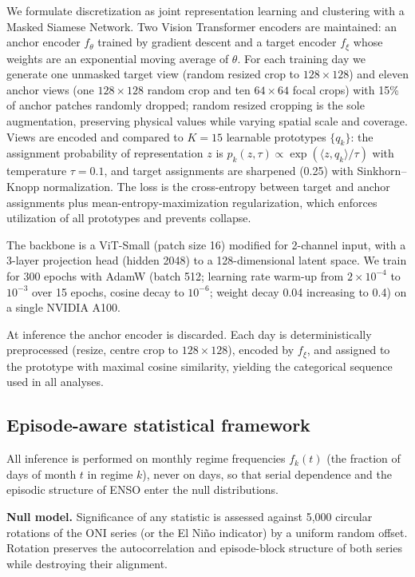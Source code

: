 \documentclass[pdflatex,sn-nature]{sn-jnl}
\begin{document}
We formulate discretization as joint representation learning and clustering with a Masked Siamese Network\cite{msn}. Two Vision Transformer\cite{vit_paper} encoders are maintained: an anchor encoder $f_\theta$ trained by gradient descent and a target encoder $f_\xi$ whose weights are an exponential moving average of $\theta$. For each training day we generate one unmasked target view (random resized crop to $128 \times 128$) and eleven anchor views (one $128 \times 128$ random crop and ten $64 \times 64$ focal crops) with 15\% of anchor patches randomly dropped; random resized cropping is the sole augmentation, preserving physical values while varying spatial scale and coverage. Views are encoded and compared to $K = 15$ learnable prototypes $\{q_k\}$\cite{caron2020swav}: the assignment probability of representation $z$ is $p_k(z,\tau) \propto \exp(\langle z, q_k\rangle/\tau)$ with temperature $\tau = 0.1$, and target assignments are sharpened (0.25) with Sinkhorn--Knopp normalization. The loss is the cross-entropy between target and anchor assignments plus mean-entropy-maximization regularization, which enforces utilization of all prototypes and prevents collapse.

The backbone is a ViT-Small (patch size 16) modified for 2-channel input, with a 3-layer projection head (hidden 2048) to a 128-dimensional latent space. We train for 300 epochs with AdamW (batch 512; learning rate warm-up from $2\times10^{-4}$ to $10^{-3}$ over 15 epochs, cosine decay to $10^{-6}$; weight decay 0.04 increasing to 0.4) on a single NVIDIA A100.

At inference the anchor encoder is discarded. Each day is deterministically preprocessed (resize, centre crop to $128 \times 128$), encoded by $f_\xi$, and assigned to the prototype with maximal cosine similarity, yielding the categorical sequence used in all analyses.

\subsection{Episode-aware statistical framework}\label{sec:statsmethods}

All inference is performed on monthly regime frequencies $f_k(t)$ (the fraction of days of month $t$ in regime $k$), never on days, so that serial dependence and the episodic structure of ENSO enter the null distributions\cite{wilks2016stippling}.

\textbf{Null model.} Significance of any statistic is assessed against 5{,}000 circular rotations of the ONI series (or the El Ni\~no indicator) by a uniform random offset\cite{ebisuzaki1997method}. Rotation preserves the autocorrelation and episode-block structure of both series while destroying their alignment.
\end{document}
